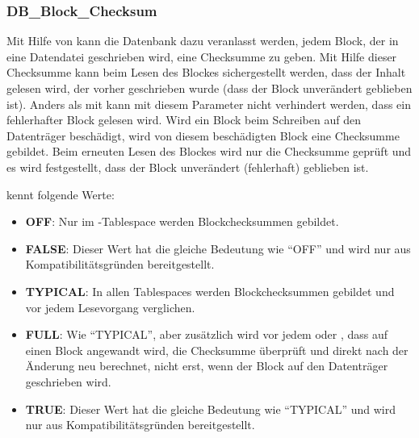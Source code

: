         \subsubsection{DB\_Block\_Checksum}
          Mit Hilfe von  kann die Datenbank dazu veranlasst werden, jedem Block, der in eine Datendatei geschrieben wird, eine Checksumme zu geben. Mit Hilfe dieser Checksumme kann beim Lesen des Blockes sichergestellt werden, dass der Inhalt gelesen wird, der vorher geschrieben wurde (dass der Block unverändert geblieben ist).
\clearpage
          Anders als mit  kann mit diesem Parameter nicht verhindert werden, dass ein fehlerhafter Block gelesen wird. Wird ein Block beim Schreiben auf den Datenträger beschädigt, wird von diesem beschädigten Block eine Checksumme gebildet. Beim erneuten Lesen des Blockes wird nur die Checksumme geprüft und es wird festgestellt, dass der Block unverändert (fehlerhaft) geblieben ist.

           kennt folgende Werte:
          \begin{itemize}
            \item \textbf{OFF}: Nur im -Tablespace werden Blockchecksummen gebildet.
            \item \textbf{FALSE}: Dieser Wert hat die gleiche Bedeutung wie \enquote{OFF} und wird nur aus Kompatibilitätsgründen bereitgestellt.
            \item \textbf{TYPICAL}: In allen Tablespaces werden Blockchecksummen gebildet und vor jedem Lesevorgang verglichen.
            \item \textbf{FULL}: Wie \enquote{TYPICAL}, aber zusätzlich wird vor jedem  oder , dass auf einen Block angewandt wird, die Checksumme überprüft und direkt nach der Änderung neu berechnet, nicht erst, wenn der Block auf den Datenträger geschrieben wird.
            \item \textbf{TRUE}: Dieser Wert hat die gleiche Bedeutung wie \enquote{TYPICAL} und wird nur aus Kompatibilitätsgründen bereitgestellt.
          \end{itemize}

